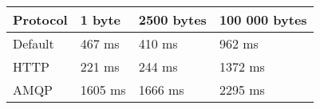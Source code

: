 \begin{tabularx}{\textwidth}{llll}
\hline
 Protocol   & 1 byte   & 2500 bytes   & 100 000 bytes   \\
\hline
 Default    & 467 ms   & 410 ms       & 962 ms          \\
 HTTP       & 221 ms   & 244 ms       & 1372 ms         \\
 AMQP       & 1605 ms  & 1666 ms      & 2295 ms         \\
\hline
\end{tabularx}